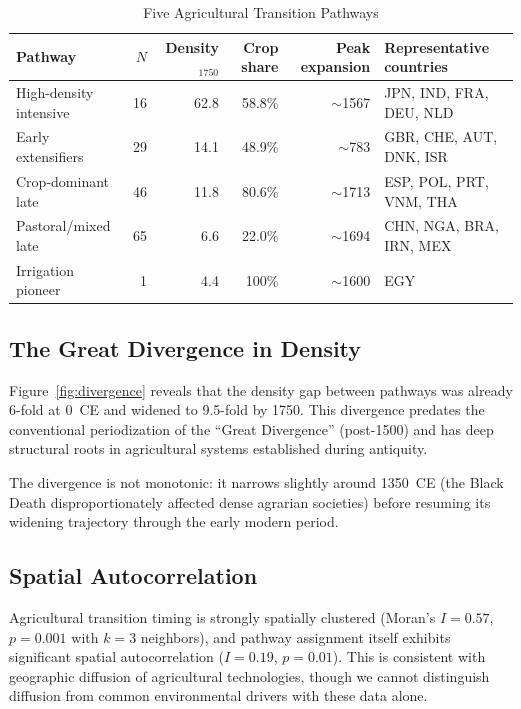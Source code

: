 \documentclass[12pt,letterpaper]{article}
\begin{document}
\begin{table}[H]
\centering
\caption{Five Agricultural Transition Pathways}
\label{tab:pathways}
\small
\begin{tabularx}{\textwidth}{lrrrrl}
\toprule
Pathway & $N$ & Density$_{1750}$ & Crop share & Peak expansion & Representative countries \\
\midrule
High-density intensive & 16 & 62.8 & 58.8\% & $\sim$1567 & JPN, IND, FRA, DEU, NLD \\
Early extensifiers & 29 & 14.1 & 48.9\% & $\sim$783 & GBR, CHE, AUT, DNK, ISR \\
Crop-dominant late & 46 & 11.8 & 80.6\% & $\sim$1713 & ESP, POL, PRT, VNM, THA \\
Pastoral/mixed late & 65 & 6.6 & 22.0\% & $\sim$1694 & CHN, NGA, BRA, IRN, MEX \\
Irrigation pioneer & 1 & 4.4 & 100\% & $\sim$1600 & EGY \\
\bottomrule
\end{tabularx}
\end{table}

\subsection{The Great Divergence in Density}

Figure~\ref{fig:divergence} reveals that the density gap between pathways was already 6-fold at 0~CE and widened to 9.5-fold by 1750. This divergence predates the conventional periodization of the ``Great Divergence'' (post-1500) and has deep structural roots in agricultural systems established during antiquity.

The divergence is not monotonic: it narrows slightly around 1350~CE (the Black Death disproportionately affected dense agrarian societies) before resuming its widening trajectory through the early modern period.

\subsection{Spatial Autocorrelation}

Agricultural transition timing is strongly spatially clustered (Moran's $I = 0.57$, $p = 0.001$ with $k = 3$ neighbors), and pathway assignment itself exhibits significant spatial autocorrelation ($I = 0.19$, $p = 0.01$). This is consistent with geographic diffusion of agricultural technologies, though we cannot distinguish diffusion from common environmental drivers with these data alone.
\end{document}
